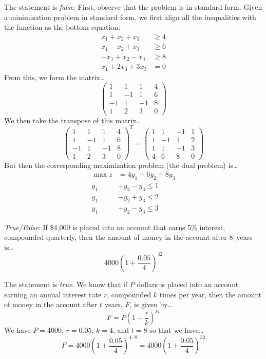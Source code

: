 \documentclass[11pt,letterpaper]{article}
\begin{document}
\sol The statement is \textit{false}. First, observe that the problem is in standard form. Given a minimization problem in standard form, we first align all the inequalities with the function as the bottom equation:
	\[
	\begin{aligned}
	x_1 + x_2 + x_3&\geq 4 \\
	x_1 - x_2 + x_3&\geq 6 \\
	-x_1 + x_2 - x_3&\geq 8 \\
	x_1 + 2x_3 + 3x_3&= 0 
	\end{aligned}
	\]
From this, we form the matrix\dots
	\[
	\begin{pmatrix}
	1 & 1 & 1 & 4 \\
	1 & -1 & 1 & 6 \\
	-1 & 1 & -1 & 8 \\
	1 & 2 & 3 & 0 
	\end{pmatrix}
	\]
We then take the transpose of this matrix\dots
	\[
	\begin{pmatrix}
	1 & 1 & 1 & 4 \\
	1 & -1 & 1 & 6 \\
	-1 & 1 & -1 & 8 \\
	1 & 2 & 3 & 0 
	\end{pmatrix}^T= 
	\begin{pmatrix}
	1 & 1 & -1 & 1 \\
	1 & -1 & 1 & 2 \\
	1 & 1 & -1 & 3 \\
	4 & 6 & 8 & 0 
	\end{pmatrix}
	\]
But then the corresponding maximization problem (the dual problem) is\dots
	\[
	\begin{aligned}
	\max z&= 4y_1 + 6y_2 + 8y_3 \\
	y_1 &+ y_2 - y_3 \leq 1 \\
	y_1 &- y_2 + y_3 \leq 2 \\
	y_1 &+ y_2 - y_3 \leq 3
	\end{aligned}
	\]



\newpage



\quizsol \textit{True/False}:
If \$4,000 is placed into an account that earns 5\% interest, compounded quarterly, then the amount of money in the account after 8~years is\dots
	\[
	4000 \left(1 + \dfrac{0.05}{4} \right)^{32}
	\]

\sol The statement is \textit{true}. We know that if $P$ dollars is placed into an account earning an annual interest rate $r$, compounded $k$ times per year, then the amount of money in the account after $t$ years, $F$, is given by\dots
	\[
	F= P \left(1 + \dfrac{r}{k} \right)^{kt}
	\]
We have $P= 4000$, $r= 0.05$, $k= 4$, and $t= 8$ so that we have\dots
	\[
	F= 4000 \left(1 + \dfrac{0.05}{4} \right)^{4 \cdot 8}= 4000 \left(1 + \dfrac{0.05}{4} \right)^{32}
	\] \pvspace{1.3cm}
\end{document}
